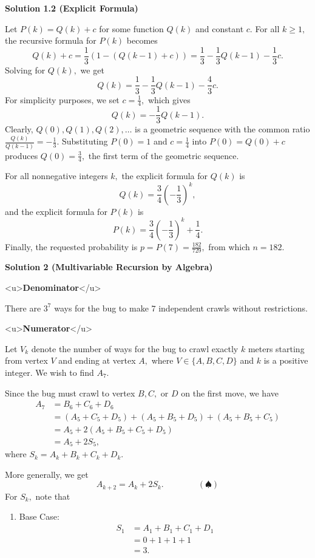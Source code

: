 \begin{enumerate}
\textbf{Solution 1.2 (Explicit Formula)}

Let $P(k)=Q(k)+c$ for some function $Q(k)$ and constant $c.$ For all $k\geq1,$ the recursive formula for $P(k)$ becomes 
 \[Q(k)+c=\frac13(1-(Q(k-1)+c))=\frac13-\frac13Q(k-1)-\frac13c.\] Solving for $Q(k),$ we get 
 \[Q(k)=\frac13-\frac13Q(k-1)-\frac43c.\]For simplicity purposes, we set $c=\frac14,$ which gives 
 \[Q(k)=-\frac13Q(k-1).\]Clearly, $Q(0),Q(1),Q(2),\ldots$ is a geometric sequence with the common ratio $\frac{Q(k)}{Q(k-1)}=-\frac13.$ Substituting $P(0)=1$ and $c=\frac14$ into $P(0)=Q(0)+c$ produces $Q(0)=\frac34,$ the first term of the geometric sequence. 

 For all nonnegative integers $k,$ the explicit formula for $Q(k)$ is 
 \[Q(k)=\frac34\left(-\frac13\right)^k,\] and the explicit formula for $P(k)$ is 
 \[P(k)=\frac34\left(-\frac13\right)^k+\frac14.\] Finally, the requested probability is $p=P(7)=\frac{182}{729},$ from which $n=\boxed{182}.$




\textbf{Solution 2 (Multivariable Recursion by Algebra)}

<u>\textbf{Denominator}</u>

 There are $3^7$ ways for the bug to make $7$ independent crawls without restrictions.

 <u>\textbf{Numerator}</u>

 Let $V_k$ denote the number of ways for the bug to crawl exactly $k$ meters starting from vertex $V$ and ending at vertex $A,$ where $V\in\{A,B,C,D\}$ and $k$ is a positive integer. We wish to find $A_7.$

 Since the bug must crawl to vertex $B,C,$ or $D$ on the first move, we have
 \begin{align*} A_7&=B_6+C_6+D_6 \\ &=(A_5+C_5+D_5)+(A_5+B_5+D_5)+(A_5+B_5+C_5) \\ &=A_5+2(A_5+B_5+C_5+D_5) \\ &=A_5+2S_5, \end{align*}
where $S_k=A_k+B_k+C_k+D_k.$

 More generally, we get 
 \[A_{k+2}=A_k+2S_k. \qquad\qquad (\spadesuit)\]For $S_k,$ note that

 
            \begin{enumerate} 
        \item Base Case:
 \begin{align*} S_1&=A_1+B_1+C_1+D_1 \\ &=0+1+1+1 \\ &=3. \end{align*}
 

\end{enumerate}
\end{enumerate}
